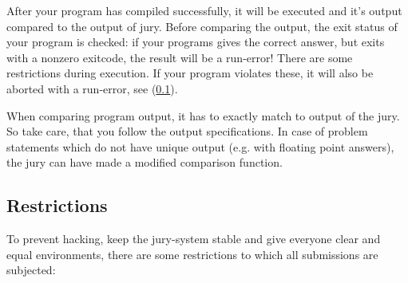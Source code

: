 After your program has compiled successfully, it will be executed and
it's output compared to the output of jury. Before comparing the
output, the exit status of your program is checked: if your programs
gives the correct answer, but exits with a nonzero exitcode, the
result will be a run-error! There are some restrictions during
execution. If your program violates these, it will also be aborted
with a run-error, see (\ref{runlimits}).

When comparing program output, it has to exactly match to output of
the jury. So take care, that you follow the output specifications. In
case of problem statements which do not have unique output (e.g. with
floating point answers), the jury can have made a modified comparison
function.

\subsection{Restrictions}\label{runlimits}

To prevent hacking, keep the jury-system stable and give everyone
clear and equal environments, there are some restrictions to which all
submissions are subjected:

